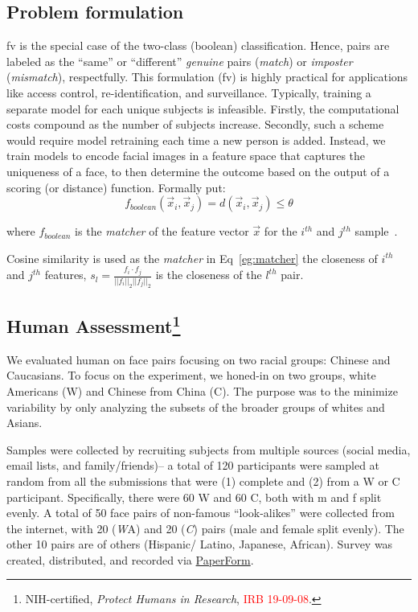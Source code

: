 \subsection{Problem formulation}\label{subsec:pf} 
\Gls{fv} is the special case of the two-class (\ie boolean) classification. Hence, pairs are labeled as the ``same'' or ``different'' \textit{genuine} pairs (\ie \textit{match}) or \textit{imposter} (\ie \textit{mismatch}), respectfully. This formulation (\ie \gls{fv}) is highly practical for applications like access control, re-identification, and surveillance. Typically, training a separate model for each unique subjects is infeasible. Firstly, the computational costs compound as the number of subjects increase.  Secondly, such a scheme would require model retraining each time a new person is added. Instead, we train models to encode facial images in a feature space that captures the uniqueness of a face, to then determine the outcome based on the output of a scoring (or distance) function. Formally put:
\begin{equation}\label{eg:matcher}
    f_{boolean}(\vec{x}_i, \vec{x}_j) = d(\vec{x}_i, \vec{x}_j) \leq \theta
\end{equation}

where $f_{boolean}$ is the \textit{matcher} of the feature vector $\vec{x}$ for the $i^{th}$ and $j^{th}$ sample~\cite{LFWTech}.

Cosine similarity is used as the \emph{matcher} in Eq~\ref{eg:matcher} the closeness of $i^{th}$ and $j^{th}$ features, \ie
$
s_l= \frac{f_i\cdot f_j}{||f_i||_2||f_j||_2}
$ is the closeness of the $l^{th}$ pair. 


\subsection{Human Assessment\footnote{NIH-certified, \textit{Protect Humans in Research}, \textcolor{red}{IRB 19-09-08}.}}\label{subsec:human-assessment}
We evaluated human on face pairs focusing on two racial groups: Chinese and Caucasians. To focus on the experiment, we honed-in on two groups, white Americans (W) and Chinese from China (C). The purpose was to the minimize variability by only analyzing the subsets of the broader groups of whites and Asians. 

Samples were collected by recruiting subjects from multiple sources (\eg social media, email lists, and family/friends)-- a total of 120 participants were sampled at random from all the submissions that were (1) complete and (2) from a W or C participant. Specifically, there were 60 W and 60 C, both with \gls{m} and \gls{f} split evenly. A total of 50 face pairs of non-famous ``look-alikes'' were collected from the internet, with 20 ({\emph WA}) and 20 ({\emph C}) pairs (male and female split evenly). The other 10 pairs are of others (\eg Hispanic/ Latino, Japanese, African). Survey was created, distributed, and recorded via \href{https://paperform.co}{PaperForm}. 